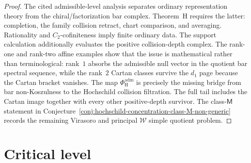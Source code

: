 \begin{proof}
The cited admissible-level analysis separates ordinary representation
theory from the chiral/factorization bar complex. Theorem~H requires
the latter: completion, the family collision retract, chart
comparison, and averaging. Rationality and $C_2$-cofiniteness imply
finite ordinary data.  The support calculation additionally evaluates
the positive collision-depth complex. The rank-one and rank-two affine examples
show that the issue is mathematical rather than terminological:
rank~$1$ absorbs the admissible null vector in the quotient bar
spectral sequence, while the rank~$2$ Cartan classes survive the
$d_1$ page because the Cartan bracket vanishes. The map
$\Phi_{\mathrm H}^{\mathrm{adm}}$ is precisely the missing bridge from
bar non-Koszulness to the Hochschild collision filtration. The full
tail includes the Cartan image together with every other
positive-depth survivor. The
class-\(\mathsf M\)
statement in
Conjecture~\ref{conj:hochschild-concentration-class-M-non-generic}
records the remaining Virasoro and principal $\mathcal W$ simple
quotient problem.
\end{proof}

\section{Critical level}
\label{sec:theorem-h-critical-level}

